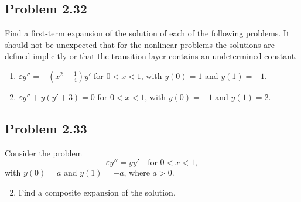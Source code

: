\documentclass[12pt]{amsart}
\begin{document}
\subsection*{Problem 2.32}
Find a first-term expansion of the solution of each of the following
problems. It should not be unexpected that for the nonlinear problems the
solutions are defined implicitly or that the transition layer contains an
undetermined constant.
\begin{enumerate}[label=(\alph*)]
  \item $\varepsilon y'' = -\left(x^2 - \tfrac{1}{4} \right)y'$ for $0 < x < 1$,
    with $y(0) = 1$ and $y(1) = -1$.

  \setcounter{enumi}{5}
  \item $\varepsilon y'' + y(y' + 3) = 0$ for $0 < x < 1$, with $y(0) = -1$ and
    $y(1) = 2$.
\end{enumerate}

\subsection*{Problem 2.33}
Consider the problem
\[
\varepsilon y'' = y y' \quad \text{for } 0 < x < 1,
\]
with $y(0) = a$ and $y(1) = -a$, where $a > 0$.
\begin{enumerate}[label=(\alph*)]
  \setcounter{enumi}{1}
  \item Find a composite expansion of the solution.
\end{enumerate}
\end{document}
